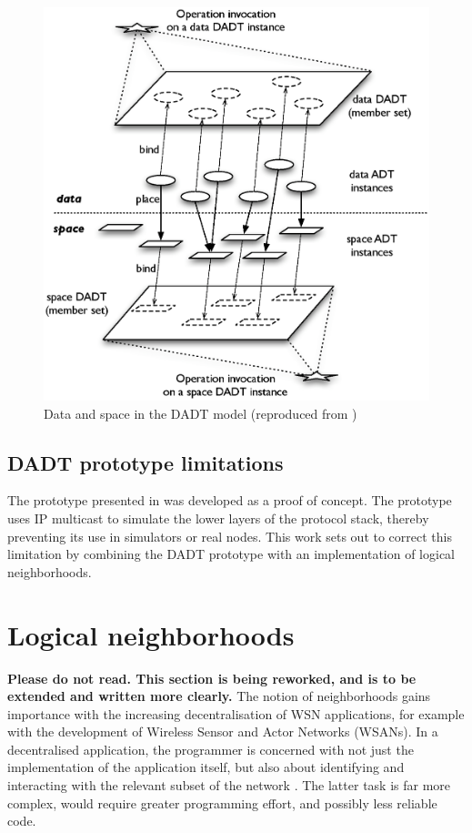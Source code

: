 \begin{figure}
\centering
\label{Fig:DADTs}
\includegraphics[scale=0.50]{img/DADTs.eps} \caption[Data and space in the DADT 
model]{Data and space in the DADT model (reproduced from 
\cite{migliavacca_DADT:2006})}
\end{figure}


\subsection {DADT prototype limitations}

The prototype presented in \cite{migliavacca_DADT:2006} was developed as a proof of 
concept. The prototype uses IP multicast to simulate the lower layers of the 
protocol stack, thereby preventing its use in simulators or real nodes. This 
work sets out to correct this limitation by combining the DADT prototype with 
an implementation of logical neighborhoods. %

\section {Logical neighborhoods} \label{LNDescription}
\textbf{Please do not read. This section is being reworked, and is to be
extended and written more clearly.}
 The notion of
neighborhoods gains importance with the increasing 
decentralisation of WSN applications, for example with the development of 
Wireless Sensor and Actor Networks (WSANs). In a decentralised application, the 
programmer is concerned with not just the implementation of the application 
itself, but also about identifying and interacting with the relevant subset of 
the network \cite{mottola_LN:2006}. The latter task is far more complex, would 
require greater programming effort, and possibly less reliable code.

